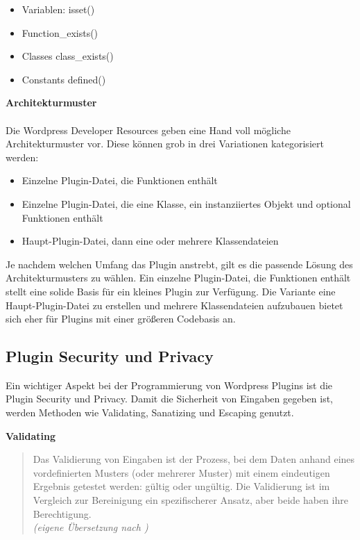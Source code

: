 \begin{itemize}
 \item Variablen: isset()
 \item Function\_exists() %
 \item Classes class\_exists()
 \item Constants defined()
\end{itemize}
\vspace{1em}
\textbf{Architekturmuster}\\\\
Die Wordpress Developer Resources geben eine Hand voll mögliche Architekturmuster vor.
Diese können grob in drei Variationen kategorisiert werden:
\begin{itemize}
 \item Einzelne Plugin-Datei, die Funktionen enthält
 \item Einzelne Plugin-Datei, die eine Klasse, ein instanziiertes Objekt und optional Funktionen enthält
 \item Haupt-Plugin-Datei, dann eine oder mehrere Klassendateien
\end{itemize}

Je nachdem welchen Umfang das Plugin anstrebt, gilt es die passende Lösung des Architekturmusters zu wählen.
Ein einzelne Plugin-Datei, die Funktionen enthält stellt eine solide Basis für ein kleines Plugin zur Verfügung.
Die Variante eine Haupt-Plugin-Datei zu erstellen und mehrere Klassendateien aufzubauen bietet sich eher für Plugins mit einer größeren Codebasis an.

\subsection{Plugin Security und Privacy}
Ein wichtiger Aspekt bei der Programmierung von Wordpress Plugins ist die Plugin Security und Privacy.
Damit die Sicherheit von Eingaben gegeben ist, werden Methoden wie Validating, Sanatizing und Escaping genutzt.

\textbf{Validating}

\begin{quote}
 Das Validierung von Eingaben ist der Prozess, bei dem Daten anhand eines vordefinierten Musters (oder mehrerer Muster) mit einem eindeutigen Ergebnis getestet werden: gültig oder ungültig.
 Die Validierung ist im Vergleich zur Bereinigung ein spezifischerer Ansatz, aber beide haben ihre Berechtigung.
 \\[0.5em]
 \emph{(eigene Übersetzung nach \cite{wordpress2024plugin_validation})}
\end{quote}

